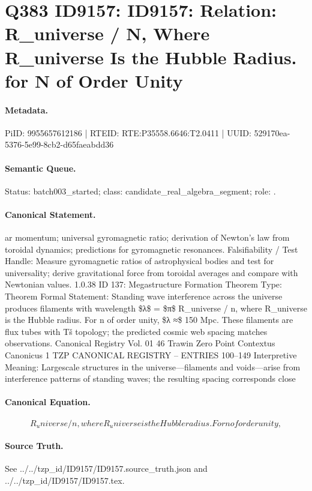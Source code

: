 \section*{Q383 ID9157: ID9157: Relation: R\_universe / N, Where R\_universe Is the Hubble Radius. for N of Order Unity}
\paragraph{Metadata.}
PiID: 9955657612186 | RTEID: RTE:P35558.6646:T2.0411 | UUID: 529170ea-5376-5e99-8cb2-d65faeabdd36

\paragraph{Semantic Queue.}
Status: batch003\_started; class: candidate\_real\_algebra\_segment; role: .

\paragraph{Canonical Statement.}
ar momentum; universal gyromagnetic ratio; derivation of Newton’s law from toroidal dynamics; predictions for gyromagnetic resonances. Falsifiability / Test Handle: Measure gyromagnetic ratios of astrophysical bodies and test for universality; derive gravitational force from toroidal averages and compare with Newtonian values. 1.0.38 ID 137: Megastructure Formation Theorem Type: Theorem Formal Statement: Standing wave interference across the universe produces filaments with wavelength \$λ\$ = \$π\$ R\_universe / n, where R\_universe is the Hubble radius. For n of order unity, \$λ ≈\$ 150 Mpc. These filaments are flux tubes with Tš topology; the predicted cosmic web spacing matches observations. Canonical Registry Vol. 01 46 Trawin Zero Point Contextus Canonicus 1 TZP CANONICAL REGISTRY – ENTRIES 100–149 Interpretive Meaning: Largescale structures in the universe—filaments and voids—arise from interference patterns of standing waves; the resulting spacing corresponds close

\paragraph{Canonical Equation.}
\[
R_universe / n, where R_universe is the Hubble radius. For n of order unity,
\]

\paragraph{Source Truth.}
See ../../tzp\_id/ID9157/ID9157.source\_truth.json and ../../tzp\_id/ID9157/ID9157.tex.
